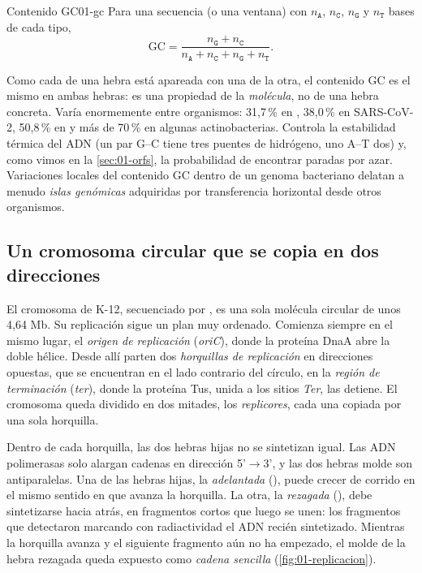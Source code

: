 \begin{definicion}{Contenido GC}{01-gc}
Para una secuencia (o una ventana) con $n_\texttt{A}$, $n_\texttt{C}$, $n_\texttt{G}$ y $n_\texttt{T}$ bases de cada tipo,
\begin{equation}\label{eq:01-gc}
\mathrm{GC} = \frac{n_\texttt{G}+n_\texttt{C}}{n_\texttt{A}+n_\texttt{C}+n_\texttt{G}+n_\texttt{T}} .
\end{equation}
\end{definicion}

Como cada  de una hebra está apareada con una  de la otra, el contenido GC es el mismo en ambas hebras: es una propiedad de la \emph{molécula}, no de una hebra concreta. Varía enormemente entre organismos: 31,7\,\% en , 38,0\,\% en SARS-CoV-2, 50,8\,\% en  y más de 70\,\% en algunas actinobacterias. Controla la estabilidad térmica del ADN (un par G--C tiene tres puentes de hidrógeno, uno A--T dos) y, como vimos en la \cref{sec:01-orfs}, la probabilidad de encontrar paradas por azar. Variaciones locales del contenido GC dentro de un genoma bacteriano delatan a menudo \emph{islas genómicas} adquiridas por transferencia horizontal desde otros organismos.

\subsection{Un cromosoma circular que se copia en dos direcciones}

El cromosoma de  K-12, secuenciado por \textcite{c01-blattner1997}, es una sola molécula circular de unos 4,64 Mb. Su replicación sigue un plan muy ordenado. Comienza siempre en el mismo lugar, el \emph{origen de replicación} (\emph{oriC}), donde la proteína DnaA abre la doble hélice. Desde allí parten dos \emph{horquillas de replicación} en direcciones opuestas, que se encuentran en el lado contrario del círculo, en la \emph{región de terminación} (\emph{ter}), donde la proteína Tus, unida a los sitios \emph{Ter}, las detiene. El cromosoma queda dividido en dos mitades, los \emph{replicores}, cada una copiada por una sola horquilla.

Dentro de cada horquilla, las dos hebras hijas no se sintetizan igual. Las ADN polimerasas solo alargan cadenas en dirección 5'$\to$3', y las dos hebras molde son antiparalelas. Una de las hebras hijas, la \emph{adelantada} (), puede crecer de corrido en el mismo sentido en que avanza la horquilla. La otra, la \emph{rezagada} (), debe sintetizarse hacia atrás, en fragmentos cortos que luego se unen: los fragmentos que \textcite{c01-okazaki1968} detectaron marcando con radiactividad el ADN recién sintetizado. Mientras la horquilla avanza y el siguiente fragmento aún no ha empezado, el molde de la hebra rezagada queda expuesto como \emph{cadena sencilla} (\cref{fig:01-replicacion}).

